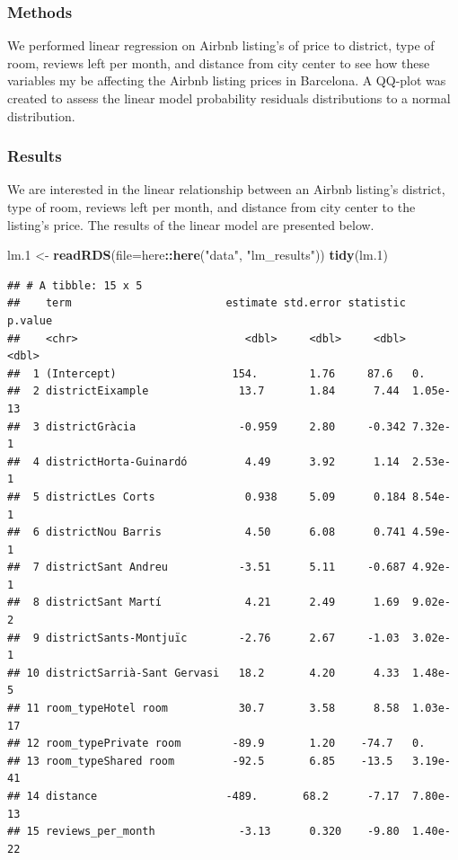 \documentclass[]{article}
\newenvironment{Shaded}{\begin{snugshade}}{\end{snugshade}}
\newcommand{\DataTypeTok}[1]{\textcolor[rgb]{0.13,0.29,0.53}{#1}}
\newcommand{\FloatTok}[1]{\textcolor[rgb]{0.00,0.00,0.81}{#1}}
\newcommand{\KeywordTok}[1]{\textcolor[rgb]{0.13,0.29,0.53}{\textbf{#1}}}
\newcommand{\NormalTok}[1]{#1}
\newcommand{\OperatorTok}[1]{\textcolor[rgb]{0.81,0.36,0.00}{\textbf{#1}}}
\newcommand{\StringTok}[1]{\textcolor[rgb]{0.31,0.60,0.02}{#1}}
\begin{document}
\hypertarget{methods}{%
\subsubsection{Methods}\label{methods}}

We performed linear regression on Airbnb listing's of price to district,
type of room, reviews left per month, and distance from city center to
see how these variables my be affecting the Airbnb listing prices in
Barcelona. A QQ-plot was created to assess the linear model probability
residuals distributions to a normal distribution.

\hypertarget{results}{%
\subsubsection{Results}\label{results}}

We are interested in the linear relationship between an Airbnb listing's
district, type of room, reviews left per month, and distance from city
center to the listing's price. The results of the linear model are
presented below.

\begin{Shaded}
\begin{Highlighting}[]
\NormalTok{lm}\FloatTok{.1}\NormalTok{ <-}\StringTok{ }\KeywordTok{readRDS}\NormalTok{(}\DataTypeTok{file=}\NormalTok{here}\OperatorTok{::}\KeywordTok{here}\NormalTok{(}\StringTok{"data"}\NormalTok{, }\StringTok{"lm_results"}\NormalTok{))}
\KeywordTok{tidy}\NormalTok{(lm}\FloatTok{.1}\NormalTok{)}
\end{Highlighting}
\end{Shaded}

\begin{verbatim}
## # A tibble: 15 x 5
##    term                        estimate std.error statistic  p.value
##    <chr>                          <dbl>     <dbl>     <dbl>    <dbl>
##  1 (Intercept)                  154.        1.76     87.6   0.      
##  2 districtEixample              13.7       1.84      7.44  1.05e-13
##  3 districtGràcia                -0.959     2.80     -0.342 7.32e- 1
##  4 districtHorta-Guinardó         4.49      3.92      1.14  2.53e- 1
##  5 districtLes Corts              0.938     5.09      0.184 8.54e- 1
##  6 districtNou Barris             4.50      6.08      0.741 4.59e- 1
##  7 districtSant Andreu           -3.51      5.11     -0.687 4.92e- 1
##  8 districtSant Martí             4.21      2.49      1.69  9.02e- 2
##  9 districtSants-Montjuïc        -2.76      2.67     -1.03  3.02e- 1
## 10 districtSarrià-Sant Gervasi   18.2       4.20      4.33  1.48e- 5
## 11 room_typeHotel room           30.7       3.58      8.58  1.03e-17
## 12 room_typePrivate room        -89.9       1.20    -74.7   0.      
## 13 room_typeShared room         -92.5       6.85    -13.5   3.19e-41
## 14 distance                    -489.       68.2      -7.17  7.80e-13
## 15 reviews_per_month             -3.13      0.320    -9.80  1.40e-22
\end{verbatim}
\end{document}
